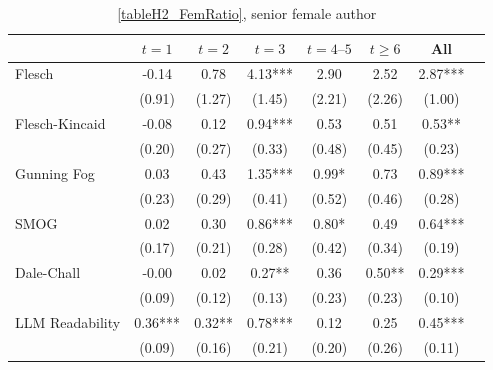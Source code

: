\begin{table}
    \footnotesize
    \centering
    \begin{threeparttable}
        \caption{\autoref{tableH2_FemRatio}, senior female author}
        \label{tableH2_FemSenior}
        \begin{tabular}{p{3cm}S@{}S@{}S@{}S@{}S@{}S@{}S@{}}
            \toprule
            &{\(t=1\)}&{\(t=2\)}&{\(t=3\)}&{\(t=4\text{--}5\)}&{\(t\ge6\)}&{All}\\
            \midrule
            Flesch                        &       -0.14   &        0.78   &        4.13***&        2.90   &        2.52   &        2.87***\\
                                          &      (0.91)   &      (1.27)   &      (1.45)   &      (2.21)   &      (2.26)   &      (1.00)   \\
            Flesch-Kincaid                &       -0.08   &        0.12   &        0.94***&        0.53   &        0.51   &        0.53** \\
                                          &      (0.20)   &      (0.27)   &      (0.33)   &      (0.48)   &      (0.45)   &      (0.23)   \\
            Gunning Fog                   &        0.03   &        0.43   &        1.35***&        0.99*  &        0.73   &        0.89***\\
                                          &      (0.23)   &      (0.29)   &      (0.41)   &      (0.52)   &      (0.46)   &      (0.28)   \\
            SMOG                          &        0.02   &        0.30   &        0.86***&        0.80*  &        0.49   &        0.64***\\
                                          &      (0.17)   &      (0.21)   &      (0.28)   &      (0.42)   &      (0.34)   &      (0.19)   \\
            Dale-Chall                    &       -0.00   &        0.02   &        0.27** &        0.36   &        0.50** &        0.29***\\
                                          &      (0.09)   &      (0.12)   &      (0.13)   &      (0.23)   &      (0.23)   &      (0.10)   \\
            LLM Readability               &        0.36***&        0.32** &        0.78***&        0.12   &        0.25   &        0.45***\\
                                          &      (0.09)   &      (0.16)   &      (0.21)   &      (0.20)   &      (0.26)   &      (0.11)   \\

\end{tabular}
\end{threeparttable}
\end{table}
